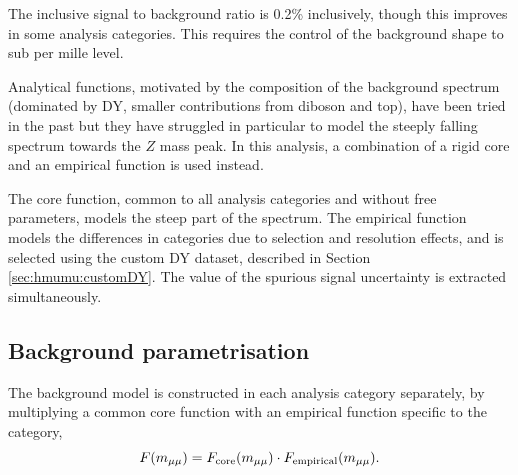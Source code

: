 The inclusive signal to background ratio is 0.2\% inclusively,
though this improves in some analysis categories. This requires
the control of the background shape to sub per mille level.

Analytical functions, motivated by the composition of the
background spectrum (dominated by DY, smaller contributions
from diboson and top), have been tried in the past but they have
struggled in particular to model the steeply falling spectrum
towards the $Z$ mass peak. In this analysis, a combination
of a rigid core and an empirical function is used instead.

The core function, common to all analysis categories and without
free parameters, models the steep part of the spectrum. The
empirical function models the differences in categories
due to selection and resolution effects, and is selected
using the custom DY dataset, described in Section \ref{sec:hmumu:customDY}.
The value of the spurious signal uncertainty is extracted
simultaneously.

\subsection{Background parametrisation}

The background model is constructed in each analysis category
separately, by multiplying a common core function with an
empirical function specific to the category,
\begin{equation}
F(m_{\mu\mu}) = F_\text{core}(m_{\mu\mu}) \cdot F_{\text{empirical}}(m_{\mu\mu}).
\end{equation}

